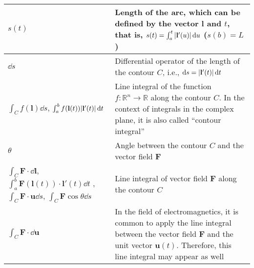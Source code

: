 \begin{xltabular}{\textwidth}{XX}
	\(s(t)\)                                                                                                                                                                                                                                   & Length of the arc, which can be defined by the vector \(\mathbf{l}\) and \(t\), that is, \(s(t) = \int_a^t \abs{\mathbf{l}'(u)} \dd{u}\) (\(s(b) = L\))\cite{stewartCalculus2011}                                                                                                                                                   \\ \hline
	\(\dd{s}\)                                                                                                                                                                                                                                 & Differential operator of the length of the contour \(C\), i.e., \(\dd{s} = \abs{\mathbf{l}'(t)} \dd{t}\) \cite{stewartCalculus2011}                                                                                                                                                                                                 \\ \hline
	\(\int_C f(\mathbf{l}) \dd{s}\), \(\int_a^b f(\mathbf{l}(t)) \abs{\mathbf{l}'(t)} \dd{t}\)                                                                                                                                                     & Line integral of the function \(f: \mathbb{R}^{n} \rightarrow \mathbb{R}\) along the contour \(C\). In the context of integrals in the complex plane, it is also called ``contour integral'' \\ \hline
    \(\theta\) \cite{ramoFieldsWavesCommunication1994} & Angle between the contour \(C\) and the vector field \(\mathbf{F}\) \\ \hline
	\(\int_C \mathbf{F}\cdot\dd{\mathbf{l}}\), \(\int_a^b \mathbf{F}(\mathbf{l}(t)) \cdot \mathbf{l}'(t) \dd{t}\) \cite{apostolCalculus2ndEdn1967,stewartCalculus2011}, \(\int_C \mathbf{F}\cdot\mathbf{u} \dd{s}\), \(\int_C \mathbf{F} \cos{\theta} \dd{s}\) \cite{ramoFieldsWavesCommunication1994}                                                                                         & Line integral of vector field \(\mathbf{F}\) along the contour \(C\)                                                                                                                                                                                                          \\ \hline
	\(\int_C \mathbf{F}\cdot\dd{\mathbf{u}}\) \cite{ramoFieldsWavesCommunication1994}                                                                                         & In the field of electromagnetics, it is common to apply the line integral between the vector field \(\mathbf{F}\) and the unit vector \(\mathbf{u}(t)\). Therefore, this line integral may appear as well                                                                                                                                                                                                            \\ \hline

\end{xltabular}
